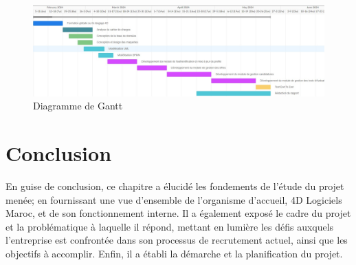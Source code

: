 \begin{figure}[h]
    \centering
    \includegraphics[scale=0.6]{Images/gantt.jpg} %
    \caption{Diagramme de Gantt}
    \label{fig:gantt}
\end{figure}



\section{Conclusion}
En guise de conclusion, ce chapitre a élucidé les fondements de l’étude du projet
menée; en fournissant une vue d’ensemble de l’organisme d’accueil, 4D Logiciels Maroc,
et de son fonctionnement interne. Il a également exposé le cadre du projet et la problématique à laquelle
il répond, mettant en lumière les défis auxquels l’entreprise est confrontée dans son
processus de recrutement actuel, ainsi que les objectifs à accomplir. Enfin, il a établi la
démarche et la planification du projet.



